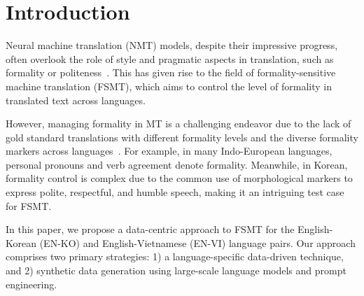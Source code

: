 \documentclass{article}
\theoremstyle{plain}
\theoremstyle{definition}
\theoremstyle{remark}
\begin{document}
\begin{abstract}
In this paper, we introduce a data-driven approach for Formality-Sensitive Machine Translation (FSMT) that caters to the unique linguistic properties of four target languages. Our methodology centers on two core strategies: 1) language-specific data handling, and 2) synthetic data generation using large-scale language models and empirical prompt engineering. This approach demonstrates a considerable improvement over the baseline, highlighting the effectiveness of data-centric techniques. Our prompt engineering strategy further improves performance by producing superior synthetic translation examples.
\end{abstract}

\section{Introduction}
Neural machine translation (NMT) models, despite their impressive progress, often overlook the role of style and pragmatic aspects in translation, such as formality or politeness~\cite{britz2017massive,stahlberg2020neural}. This has given rise to the field of formality-sensitive machine translation (FSMT), which aims to control the level of formality in translated text across languages.

However, managing formality in MT is a challenging endeavor due to the lack of gold standard translations with different formality levels and the diverse formality markers across languages~\cite{nuadejde2022cocoa}. For example, in many Indo-European languages, personal pronouns and verb agreement denote formality. Meanwhile, in Korean, formality control is complex due to the common use of morphological markers to express polite, respectful, and humble speech, making it an intriguing test case for FSMT.

In this paper, we propose a data-centric approach to FSMT for the English-Korean (EN-KO) and English-Vietnamese (EN-VI) language pairs. Our approach comprises two primary strategies: 1) a language-specific data-driven technique, and 2) synthetic data generation using large-scale language models and prompt engineering. 





\end{document}
